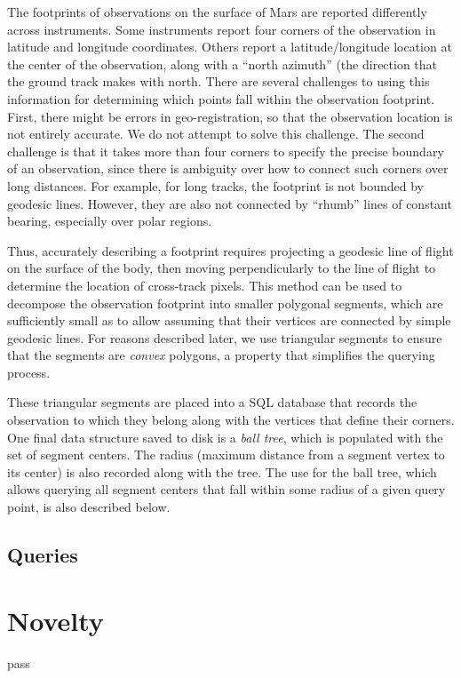 \documentclass[twocolumn]{extarticle}
\begin{document}
The footprints of observations on the surface of Mars are reported differently
across instruments. Some instruments report four corners of the observation in
latitude and longitude coordinates. Others report a latitude/longitude
location at the center of the observation, along with a ``north azimuth'' (the
direction that the ground track makes with north. There are several challenges
to using this information for determining which points fall within the
observation footprint. First, there might be errors in geo-registration, so that
the observation location is not entirely accurate. We do not attempt to solve
this challenge. The second challenge is that it takes more than four corners to
specify the precise boundary of an observation, since there is ambiguity over
how to connect such corners over long distances. For example, for long tracks,
the footprint is not bounded by geodesic lines. However, they are also not
connected by ``rhumb'' lines of constant bearing, especially over polar regions.

Thus, accurately describing a footprint requires projecting a geodesic line of
flight on the surface of the body, then moving perpendicularly to the line of
flight to determine the location of cross-track pixels. This method can be used
to decompose the observation footprint into smaller polygonal segments, which
are sufficiently small as to allow assuming that their vertices are connected by
simple geodesic lines. For reasons described later, we use triangular segments
to ensure that the segments are \emph{convex} polygons, a property that
simplifies the querying process.

These triangular segments are placed into a SQL database that records the
observation to which they belong along with the vertices that define their
corners. One final data structure saved to disk is a \emph{ball tree}, which is
populated with the set of segment centers. The radius (maximum distance from a
segment vertex to its center) is also recorded along with the tree. The use for
the ball tree, which allows querying all segment centers that fall within some
radius of a given query point, is also described below.

\subsection*{Queries}

\section*{Novelty}
pass



\end{document}
